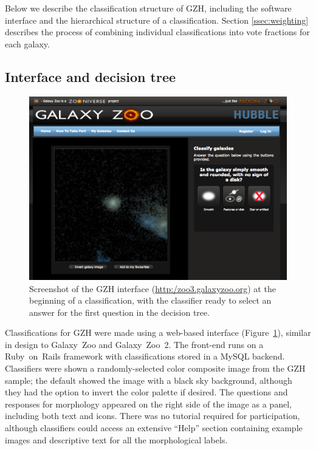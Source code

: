 \documentclass[twocolumn]{aastex6}
\begin{document}
Below we describe the classification structure of GZH, including the software 
interface and the hierarchical structure of a classification. Section \ref{ssec:weighting}
describes the process of combining individual classifications into vote fractions for each
galaxy.

\subsection{Interface and decision tree}\label{ssec:interface}

\begin{figure}
\center
\includegraphics[width=160mm]{figures/gzh_interface.png}
\caption{Screenshot of the GZH interface (\url{http:/zoo3.galaxyzoo.org}) at
the beginning of a classification, with the classifier ready to select an answer for
the first question in the decision tree.\label{fig:interface}}
\end{figure}

Classifications for GZH were made using a web-based interface
(Figure~\ref{fig:interface}), similar in design to Galaxy~Zoo and Galaxy~Zoo~2.
The front-end runs on a Ruby~on~Rails framework with classifications stored in
a MySQL backend. Classifiers were shown a randomly-selected color composite image from
the GZH sample; the default showed the image with a black sky background,
although they had the option to invert the color palette if desired. The
questions and responses for morphology appeared on the right side of the image as
a panel, including both text and icons. There was no tutorial required for
participation, although classifiers could access an extensive ``Help'' section
containing example images and descriptive text for all the morphological
labels. 
\end{document}
